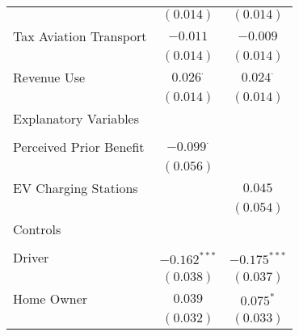 \begin{center}
\begin{tiny}
\begin{longtable}{l@{} c@{} c@{}}
                                                                         & $(0.014)$        & $(0.014)$        \\
\quad Tax Aviation Transport                                             & $-0.011$         & $-0.009$         \\
                                                                         & $(0.014)$        & $(0.014)$        \\
\quad Revenue Use                                                        & $0.026^{\cdot}$  & $0.024^{\cdot}$  \\
                                                                         & $(0.014)$        & $(0.014)$        \\
Explanatory Variables                                                    &                  &                  \\
                                                                         &                  &                  \\
\quad Perceived Prior Benefit                                            & $-0.099^{\cdot}$ &                  \\
                                                                         & $(0.056)$        &                  \\
\quad EV Charging Stations                                               &                  & $0.045$          \\
                                                                         &                  & $(0.054)$        \\
Controls                                                                 &                  &                  \\
                                                                         &                  &                  \\
\quad Driver                                                             & $-0.162^{***}$   & $-0.175^{***}$   \\
                                                                         & $(0.038)$        & $(0.037)$        \\
\quad Home Owner                                                         & $0.039$          & $0.075^{*}$      \\
                                                                         & $(0.032)$        & $(0.033)$        \\

\end{longtable}
\end{tiny}
\end{center}
